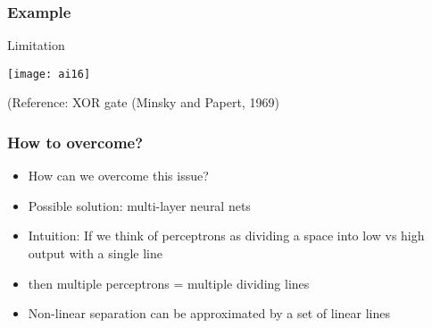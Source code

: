 \begin{frame}[fragile] \frametitle{Example}
Limitation
\begin{center}
\texttt{[image: ai16]}
\end{center}
\tiny{(Reference: XOR gate (Minsky and Papert, 1969)}

\end{frame}

\begin{frame}[fragile] \frametitle{How to overcome?}

\begin{itemize}
\item How can we overcome this issue?
\item Possible solution: multi-layer neural nets
\item Intuition: If we think of perceptrons as dividing a space into low vs high output with a single line
\item then multiple perceptrons = multiple dividing lines
\item Non-linear separation can be approximated by a set of linear lines

\end{itemize}

\end{frame}
%
%
%

